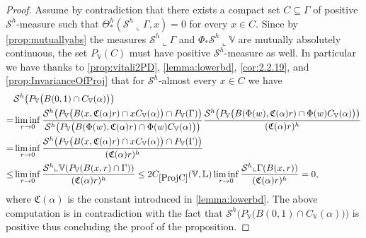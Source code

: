 \documentclass[10pt, a4paper,
oneside, headinclude,footinclude]{scrartcl}
\begin{document}
\begin{proof}
Assume by contradiction that there exists a compact set $C\subseteq \Gamma$ of positive $\mathcal{S}^h$-measure such that $\Theta^h_*(\mathcal{S}^h\llcorner\Gamma,x)=0$ for every $x\in C$. Since by \cref{prop:mutuallyabs} the measures $\mathcal{S}^h\llcorner \Gamma$ and $\Phi_*\mathcal{S}^h\llcorner \mathbb{V}$ are mutually absolutely continuous, the set $P_\mathbb{V}(C)$ must have positive $\mathcal{S}^h$-measure as well. In particular we have thanks to \cref{prop:vitali2PD}, \cref{lemma:lowerbd}, \cref{cor:2.2.19}, and \cref{prop:InvarianceOfProj} that for $\mathcal{S}^h$-almost every $x\in C$ we have
\begin{equation}
    \begin{split}
        &\mathcal{S}^h\big(P_\mathbb{V}\big(B(0,1)\cap C_\mathbb{V}(\alpha)\big)\big)\\=&\liminf_{r\to 0}\frac{\mathcal{S}^h\big(P_\mathbb{V}\big(B(x,\mathfrak{C}(\alpha)r)\cap xC_\mathbb{V}(\alpha)\big)\cap P_\mathbb{V}(\Gamma)\big)}{\mathcal{S}^h\big(P_\mathbb{V}\big(B(\Phi(w),\mathfrak{C}(\alpha)r)\cap \Phi(w)C_\mathbb{V}(\alpha)\big)\big)}\frac{\mathcal{S}^h\big(P_\mathbb{V}\big(B(\Phi(w),\mathfrak{C}(\alpha)r)\cap \Phi(w)C_\mathbb{V}(\alpha)\big)\big)}{(\mathfrak{C}(\alpha)r)^h}\\
        =&\liminf_{r\to 0}\frac{\mathcal{S}^h\big(P_\mathbb{V}\big(B(x,\mathfrak{C}(\alpha)r)\cap xC_\mathbb{V}(\alpha)\big)\cap P_\mathbb{V}(\Gamma)\big)}{(\mathfrak{C}(\alpha)r)^h}\\
        \leq& \liminf_{r\to 0}\frac{\mathcal{S}^h\llcorner \mathbb{V}(P_\mathbb{V}(B(x,r)\cap \Gamma))}{(\mathfrak{C}(\alpha)r)^h}\leq 2\oldC{ProjC}(\mathbb{V},\mathbb L)\liminf_{r\to 0}\frac{\mathcal{S}^h\llcorner \Gamma(B(x,r))}{(\mathfrak{C}(\alpha)r)^h}=0,
        \nonumber
    \end{split}
\end{equation}
where $\mathfrak{C}(\alpha)$ is the constant introduced in \cref{lemma:lowerbd}. The above computation is in contradiction with the fact that $\mathcal{S}^h\big(P_\mathbb{V}\big(B(0,1)\cap C_\mathbb{V}(\alpha)\big)\big)$ is positive thus concluding the proof of the proposition.
\end{proof}
\end{document}
